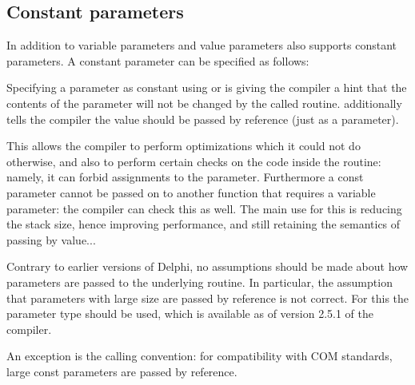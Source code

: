 %
\subsection{Constant
parameters}
In addition to variable parameters and value parameters \fpc also supports
constant parameters. A constant parameter can be specified as follows:

Specifying a parameter as constant using  or  is giving the compiler a hint that the
contents of the parameter will not be changed by the called routine.
 additionally tells the compiler the value should be passed by
reference (just as a  parameter).

This allows the compiler to perform optimizations which it could not do otherwise,
and also to perform certain checks on the code inside the routine: namely,
it can forbid assignments to the parameter.
Furthermore a const parameter cannot be passed on to another
function that requires a variable parameter: the compiler can check this as
well.
The main use for this is reducing the stack size, hence improving
performance, and still retaining the semantics of passing by value...


\begin{remark}
Contrary to earlier versions of Delphi, no assumptions should be made about
how  parameters are passed to the underlying routine.
In particular, the assumption that parameters with large size are passed by reference is not correct.
For this the  parameter type should be used, which is available as of
version 2.5.1 of the compiler.

An exception is the  calling convention: for compatibility with
COM standards, large const parameters are passed by reference.
\end{remark}


